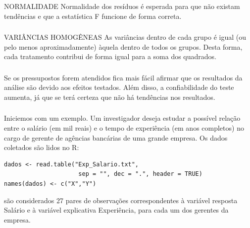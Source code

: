 \documentclass[14pt,aspectratio=1610]{beamer}
\begin{document}
\begin{frame}{}
\frametitle{ }
\begin{block}{NORMALIDADE}
\justifying
Normalidade dos resíduos é esperada para que não existam tendências e que a estatística F funcione de forma correta.
\end{block}
\end{frame}

\begin{frame}{}
\frametitle{ }
\begin{block}{VARIÂNCIAS HOMOGÊNEAS}
\justifying
As variâncias dentro de cada grupo é igual (ou pelo menos aproximadamente) àquela dentro de todos os grupos. Desta forma, cada tratamento contribui de forma igual para a soma dos quadrados.
\end{block}
\end{frame}

\begin{frame}{}
\frametitle{ }
\begin{block}{}
\justifying
Se os pressupostos forem atendidos fica mais fácil afirmar que os resultados da análise são devido aos efeitos testados. Além disso, a confiabilidade do teste aumenta, já que se terá certeza que não há tendências nos resultados.
\end{block}
\end{frame}

\begin{frame}[fragile]{}
\frametitle{ }
\begin{block}{}
\justifying
Iniciemos com um exemplo. Um investigador deseja estudar a possível relação entre o salário (em mil reais) e o tempo de experiência (em anos completos) no cargo de gerente de agências bancárias de uma grande empresa. Os dados coletados são lidos no R:
\end{block}
\begin{block}{}
\begin{verbatim}
dados <- read.table("Exp_Salario.txt", 
                     sep = "", dec = ".", header = TRUE)
names(dados) <- c("X","Y")    
\end{verbatim}
\end{block}\pause
\begin{block}{}
são considerados 27 pares de observações correspondentes à variável resposta Salário e à variável explicativa Experiência, para cada um dos gerentes da empresa.
\end{block}
\end{frame}
\end{document}
